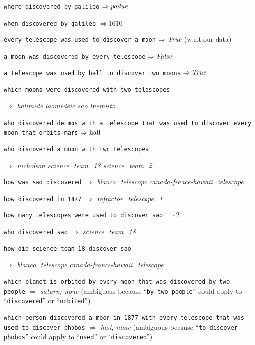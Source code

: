 \documentclass[../main.tex]{subfiles}
\begin{document}
\begin{refsection}
\examplespacing

\texttt{where discovered by galileo} $\Rightarrow \operatorname{\mathit{padua}}$

\texttt{when discovered by galileo} $\Rightarrow 1610$

\texttt{every telescope was used to discover a moon} $\Rightarrow \operatorname{\mathit{True}}$ (w.r.t.our data)

\texttt{a moon was discovered by every telescope} $\Rightarrow \operatorname{\mathit{False}}$

\texttt{a telescope was used by hall to discover two moons} $\Rightarrow \operatorname{\mathit{True}}$

\texttt{which moons were discovered with two telescopes}

\noindent $\Rightarrow$ \textit{halimede laomedeia sao themisto}

\texttt{who discovered deimos with a telescope that was used to discover \linebreak every moon that orbits mars} $\Rightarrow \operatorname{hall}$

\texttt{who discovered a moon with two telescopes}

\noindent $\Rightarrow$ \textit{nicholson science\_team\_18 science\_team\_2}

\texttt{how was sao discovered} $\Rightarrow$ \textit{blanco\_telescope canada-france-hawaii\_telescope}

\texttt{how discovered in 1877} $\Rightarrow$ \textit{refractor\_telescope\_1}

\texttt{how many telescopes were used to discover sao} $\Rightarrow 2$

\texttt{who discovered sao}  $\Rightarrow$ \textit{science\_team\_18}

\texttt{how did science\_team\_18 discover sao}

\noindent $\Rightarrow$ \textit{blanco\_telescope canada-france-hawaii\_telescope}

\texttt{which planet is orbited by every moon that was discovered by \linebreak two people}
$\Rightarrow$ \textit{saturn; none} (ambiguous because ``\texttt{by two people}'' could apply to ``\texttt{discovered}'' or ``\texttt{orbited}'')

\texttt{which person discovered a moon in 1877 with every telescope \linebreak that was used to discover phobos} $\Rightarrow$ \textit{hall; none} (ambiguous because ``\texttt{to discover phobos}'' could apply to ``\texttt{used}'' or ``\texttt{discovered}'')


\end{refsection}
\end{document}
